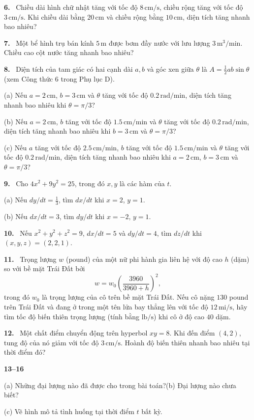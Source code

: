 \documentclass[12pt,a4paper]{article}
\newcommand{\bt}[1]{\par\smallskip\Needspace{5\baselineskip}\noindent\textbf{#1.}\ }
\newcommand{\group}[1]{\par\medskip\noindent\textbf{#1}\par\nopagebreak[4]}
\begin{document}
\bt{6} Chiều dài hình chữ nhật tăng với tốc độ $8\,\mathrm{cm/s}$, chiều rộng tăng với tốc độ $3\,\mathrm{cm/s}$. Khi chiều dài bằng $20\,\mathrm{cm}$ và chiều rộng bằng $10\,\mathrm{cm}$, diện tích tăng nhanh bao nhiêu?

\bt{7} Một bể hình trụ bán kính $5\,\mathrm{m}$ được bơm đầy nước với lưu lượng $3\,\mathrm{m^3/min}$. Chiều cao cột nước tăng nhanh bao nhiêu?

\bt{8} Diện tích của tam giác có hai cạnh dài $a,b$ và góc xen giữa $\theta$ là $A=\tfrac12ab\sin\theta$ (xem Công thức 6 trong Phụ lục D).

(a) Nếu $a=2\,\mathrm{cm}$, $b=3\,\mathrm{cm}$ và $\theta$ tăng với tốc độ $0.2\,\mathrm{rad/min}$, diện tích tăng nhanh bao nhiêu khi $\theta=\pi/3$?

(b) Nếu $a=2\,\mathrm{cm}$, $b$ tăng với tốc độ $1.5\,\mathrm{cm/min}$ và $\theta$ tăng với tốc độ $0.2\,\mathrm{rad/min}$, diện tích tăng nhanh bao nhiêu khi $b=3\,\mathrm{cm}$ và $\theta=\pi/3$?

(c) Nếu $a$ tăng với tốc độ $2.5\,\mathrm{cm/min}$, $b$ tăng với tốc độ $1.5\,\mathrm{cm/min}$ và $\theta$ tăng với tốc độ $0.2\,\mathrm{rad/min}$, diện tích tăng nhanh bao nhiêu khi $a=2\,\mathrm{cm}$, $b=3\,\mathrm{cm}$ và $\theta=\pi/3$?

\bt{9} Cho $4x^2+9y^2=25$, trong đó $x,y$ là các hàm của $t$.

(a) Nếu $dy/dt=\tfrac13$, tìm $dx/dt$ khi $x=2$, $y=1$.

(b) Nếu $dx/dt=3$, tìm $dy/dt$ khi $x=-2$, $y=1$.

\bt{10} Nếu $x^2+y^2+z^2=9$, $dx/dt=5$ và $dy/dt=4$, tìm $dz/dt$ khi $(x,y,z)=(2,2,1)$.

\bt{11} Trọng lượng $w$ (pound) của một nữ phi hành gia liên hệ với độ cao $h$ (dặm) so với bề mặt Trái Đất bởi
\[w=w_0\left(\frac{3960}{3960+h}\right)^2,\]
trong đó $w_0$ là trọng lượng của cô trên bề mặt Trái Đất. Nếu cô nặng $130$ pound trên Trái Đất và đang ở trong một tên lửa bay thẳng lên với tốc độ $12\,\mathrm{mi/s}$, hãy tìm tốc độ biến thiên trọng lượng (tính bằng $\mathrm{lb/s}$) khi cô ở độ cao $40$ dặm.

\bt{12} Một chất điểm chuyển động trên hyperbol $xy=8$. Khi đến điểm $(4,2)$, tung độ của nó giảm với tốc độ $3\,\mathrm{cm/s}$. Hoành độ biến thiên nhanh bao nhiêu tại thời điểm đó?

\group{13–16}
(a) Những đại lượng nào đã được cho trong bài toán?\quad (b) Đại lượng nào chưa biết?

(c) Vẽ hình mô tả tình huống tại thời điểm $t$ bất kỳ.
\end{document}
